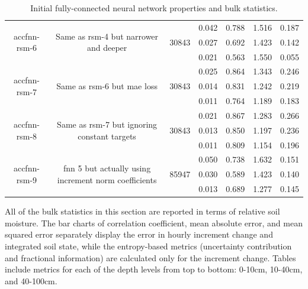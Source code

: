 \begin{table}[h!p]
\begin{sideways}
\begin{tabular}{c|c|c|c|c|c|c }
\hline
\multirow{3}{6em}{accfnn-rsm-6} & \multirow{3}{16em}{Same as rsm-4 but narrower and deeper} & \multirow{3}{4em}{30843} & 0.042 & 0.788 & 1.516 & 0.187 \\ & & & 0.027 & 0.692 & 1.423 & 0.142 \\ & & & 0.021 & 0.563 & 1.550 & 0.055 \\
\hline
\multirow{3}{6em}{accfnn-rsm-7} & \multirow{3}{16em}{Same as rsm-6 but mae loss} & \multirow{3}{4em}{30843} & 0.025 & 0.864 & 1.343 & 0.246 \\ & & & 0.014 & 0.831 & 1.242 & 0.219 \\ & & & 0.011 & 0.764 & 1.189 & 0.183 \\
\hline
\multirow{3}{6em}{accfnn-rsm-8} & \multirow{3}{16em}{Same as rsm-7 but ignoring constant targets} & \multirow{3}{4em}{30843} & 0.021 & 0.867 & 1.283 & 0.266 \\ & & & 0.013 & 0.850 & 1.197 & 0.236 \\ & & & 0.011 & 0.809 & 1.154 & 0.196 \\
\hline
\multirow{3}{6em}{accfnn-rsm-9} & \multirow{3}{16em}{fnn 5 but actually using increment norm coefficients} & \multirow{3}{4em}{85947} & 0.050 & 0.738 & 1.632 & 0.151 \\ & & & 0.030 & 0.589 & 1.423 & 0.140 \\ & & & 0.013 & 0.689 & 1.277 & 0.145 \\
    \end{tabular}
\end{sideways}
    \caption{Initial fully-connected neural network properties and bulk statistics.}
    \label{model-init-fnn-table}
\end{table}

All of the bulk statistics in this section are reported in terms of relative soil moisture. The bar charts of correlation coefficient, mean absolute error, and mean squared error separately display the error in hourly increment change and integrated soil state, while the entropy-based metrics (uncertainty contribution and fractional information) are calculated only for the increment change. Tables include metrics for each of the depth levels from top to bottom: 0-10cm, 10-40cm, and 40-100cm.

